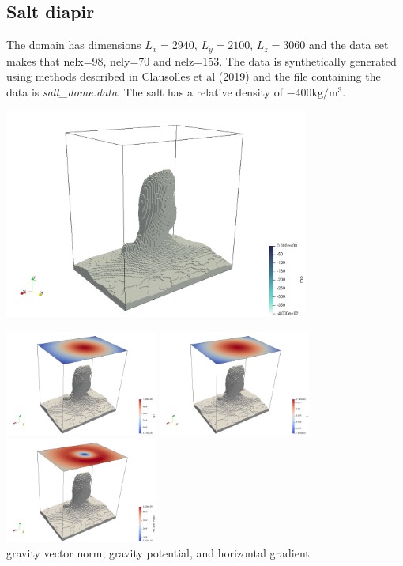 \newpage
\subsection*{Salt diapir}


The domain has dimensions $L_x=2940$, $L_y=2100$, $L_z=3060$ and the data set makes that  
nelx=98, nely=70 and nelz=153. The data is
synthetically generated using methods described in 
Clausolles et al (2019) \cite{clcc19}
and the file containing the data is {\sl salt\_dome.data}.
The salt has a relative density of $-400\si{\kg\per\cubic\metre}$.

\begin{center}
\includegraphics[width=10cm]{python_codes/fieldstone_84/diapir/diapir.png}
\end{center}


\begin{center}
\includegraphics[width=5cm]{python_codes/fieldstone_84/diapir/g.png}
\includegraphics[width=5cm]{python_codes/fieldstone_84/diapir/U.png}
\includegraphics[width=5cm]{python_codes/fieldstone_84/diapir/horgrad.png}\\
{\captionfont gravity vector norm, gravity potential, and horizontal gradient}
\end{center}



